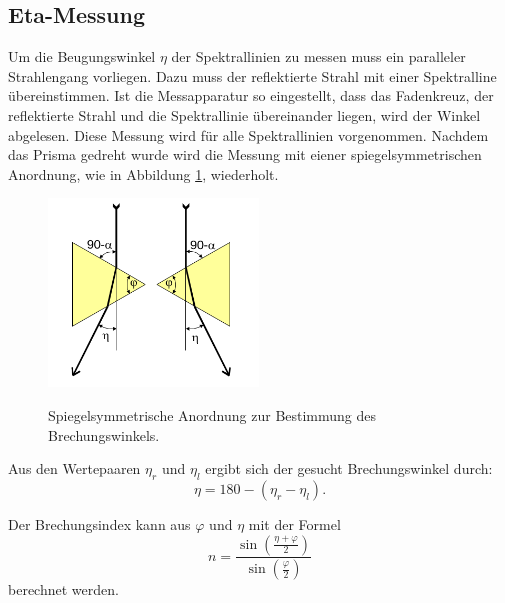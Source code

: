 \subsection{Eta-Messung}
Um die Beugungswinkel $\eta$ der Spektrallinien zu messen muss ein
paralleler Strahlengang vorliegen. Dazu muss der reflektierte
Strahl mit einer Spektralline übereinstimmen. Ist die Messapparatur
so eingestellt, dass das Fadenkreuz, der reflektierte Strahl und die
Spektrallinie übereinander liegen, wird der Winkel abgelesen.
Diese Messung wird für alle Spektrallinien vorgenommen.
Nachdem das Prisma gedreht wurde wird die Messung mit eiener
spiegelsymmetrischen Anordnung, wie in Abbildung
\ref{fig:spiegel}, wiederholt.

\begin{figure}[H]
  \centering
  \includegraphics[height=5cm]{spiegel.png}
  \caption{Spiegelsymmetrische Anordnung zur Bestimmung des Brechungswinkels.}
  \label{fig:spiegel}
  \cite{skript}
\end{figure}

Aus den Wertepaaren $\eta_r$ und $\eta_l$ ergibt sich der gesucht
Brechungswinkel durch:
\begin{equation}
  \eta=180-(\eta_r - \eta_l).
  \label{eqn:eta}
\end{equation}

Der Brechungsindex kann aus $\varphi$ und $\eta$ mit der Formel
\begin{equation}
  n=\frac{\sin{(\frac{\eta+\varphi}{2})}}{\sin{(\frac{\varphi}{2})}}
  \label{eqn:brechungsindex}
\end{equation}
berechnet werden.
